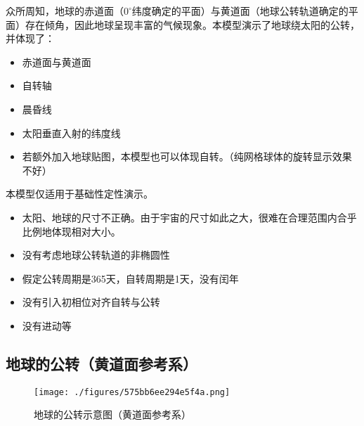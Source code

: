 

众所周知，地球的赤道面（$0 ^\circ$纬度确定的平面）与黄道面（地球公转轨道确定的平面）存在倾角，因此地球呈现丰富的气候现象。本模型演示了地球绕太阳的公转，并体现了：
\begin{itemize}
\item 赤道面与黄道面
\item 自转轴
\item 晨昏线
\item 太阳垂直入射的纬度线
\item 若额外加入地球贴图，本模型也可以体现自转。（纯网格球体的旋转显示效果不好）
\end{itemize}

本模型仅适用于基础性定性演示。
\begin{itemize}
\item 太阳、地球的尺寸不正确。由于宇宙的尺寸如此之大，很难在合理范围内合乎比例地体现相对大小。
\item 没有考虑地球公转轨道的非椭圆性
\item 假定公转周期是365天，自转周期是1天，没有闰年
\item 没有引入初相位对齐自转与公转
\item 没有进动等
\end{itemize}

\subsection{地球的公转（黄道面参考系）}
\begin{figure}[ht]
\centering
\texttt{[image: ./figures/575bb6ee294e5f4a.png]}
\caption{地球的公转示意图（黄道面参考系）} \label{fig_georev_1}
\end{figure}

